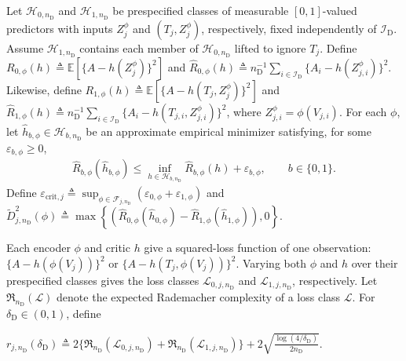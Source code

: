 \begin{definition}
\label{appdetail:def:empirical-held-out-proxy-discrepancy}
\normalfont
 Let $\mathcal H_{0,n_{\mathrm D}}$ and $\mathcal H_{1,n_{\mathrm D}}$ be prespecified classes of measurable $[0,1]$-valued predictors with inputs $Z_j^\phi$ and $(T_j,Z_j^\phi)$, respectively, fixed independently of $\mathcal I_{\mathrm D}$. Assume $\mathcal H_{1,n_{\mathrm D}}$ contains each member of $\mathcal H_{0,n_{\mathrm D}}$ lifted to ignore $T_j$. 
Define \(R_{0,\phi}(h)\triangleq\mathbb E[\{A-h(Z_j^\phi)\}^2]\) and \(\widehat R_{0,\phi}(h)\triangleq n_{\mathrm D}^{-1}\sum_{i\in\mathcal I_{\mathrm D}}\{A_i-h(Z_{j,i}^\phi)\}^2\). Likewise, define \(R_{1,\phi}(h)\triangleq\mathbb E[\{A-h(T_j,Z_j^\phi)\}^2]\) and \(\widehat R_{1,\phi}(h)\triangleq n_{\mathrm D}^{-1}\sum_{i\in\mathcal I_{\mathrm D}}\{A_i-h(T_{j,i},Z_{j,i}^\phi)\}^2\),
where $Z_{j,i}^\phi=\phi(V_{j,i})$. For each $\phi$, let $\widehat h_{b,\phi}\in\mathcal H_{b,n_{\mathrm D}}$ be an approximate empirical minimizer satisfying, for some $\varepsilon_{b,\phi}\ge0$,
\begin{align}
	\widehat R_{b,\phi}(\widehat h_{b,\phi})
	\le
	\inf_{h\in\mathcal H_{b,n_{\mathrm D}}}\widehat R_{b,\phi}(h)
	+
	\varepsilon_{b,\phi},
	\qquad b\in\{0,1\}.
	\label{eq:approximate-critic-fits}
\end{align}
Define $\varepsilon_{\mathrm{crit},j}\triangleq\sup_{\phi\in\mathcal F_{j,n_{\mathrm D}}}(\varepsilon_{0,\phi}+\varepsilon_{1,\phi})$ and
\(\widetilde D_{j,n_{\mathrm D}}^2(\phi) \triangleq \max\left\{( \widehat R_{0,\phi}(\widehat h_{0,\phi}) - \widehat R_{1,\phi}(\widehat h_{1,\phi})), 0 \right\}\).
\end{definition}

Each encoder $\phi$ and critic $h$ give a squared-loss function of one observation: $\{A-h(\phi(V_j))\}^2$ or $\{A-h(T_j,\phi(V_j))\}^2$. Varying both $\phi$ and $h$ over their prespecified classes gives the loss classes $\mathcal L_{0,j,n_{\mathrm D}}$ and $\mathcal L_{1,j,n_{\mathrm D}}$, respectively. Let $\mathfrak R_{n_{\mathrm D}}(\mathcal L)$ denote the expected Rademacher complexity of a loss class $\mathcal L$. For $\delta_{\mathrm D}\in(0,1)$, define

\(r_{j,n_{\mathrm D}}(\delta_{\mathrm D}) \triangleq 2\{\mathfrak R_{n_{\mathrm D}}(\mathcal L_{0,j,n_{\mathrm D}})+\mathfrak R_{n_{\mathrm D}}(\mathcal L_{1,j,n_{\mathrm D}})\} + 2\sqrt{\frac{\log(4/\delta_{\mathrm D})}{2n_{\mathrm D}}}.\)

